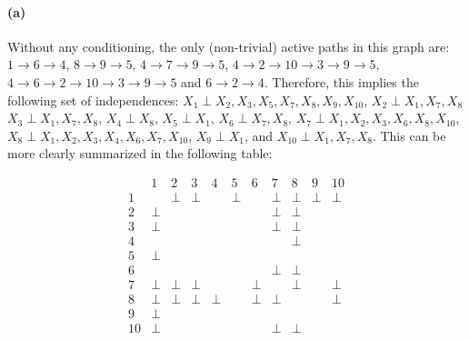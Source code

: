 \documentclass[11pt]{article}
\begin{document}
\paragraph{(a)}

Without any conditioning, the only (non-trivial) active paths in this graph
are: $1 \to 6 \to 4$, $8 \to 9 \to 5$, $4 \to 7 \to 9 \to 5$,
$4 \to 2 \to 10 \to 3 \to 9 \to 5$, $4 \to 6 \to 2 \to 10 \to 3 \to 9 \to 5$
and $6 \to 2 \to 4$.
Therefore, this implies the following set of independences:
$X_1 \perp X_2, X_3, X_5, X_7, X_8, X_9, X_{10}$, {$X_2 \perp X_1, X_7, X_8$}
{$X_3 \perp X_1, X_7, X_8$},
{$X_4 \perp X_8$},
{$X_5 \perp X_1$},
{$X_6 \perp X_7, X_8$},
{$X_7 \perp X_1, X_2, X_3, X_6, X_8, X_{10}$},
{$X_8 \perp X_1, X_2, X_3, X_4, X_6, X_7, X_{10}$},
{$X_9 \perp X_1$}, and
{$X_{10} \perp X_1, X_7, X_8$}. This can be more clearly summarized in the
following table:

\begin{equation}
    \begin{array}{c|cccccccccc}
            & 1     & 2     & 3     & 4     & 5     & 6     & 7     & 8     & 9     & 10     \\\hline
        1   &       & \perp & \perp &       & \perp &       & \perp & \perp & \perp & \perp  \\
        2   & \perp &       &       &       &       &       & \perp & \perp &       &        \\
        3   & \perp &       &       &       &       &       & \perp & \perp &       &        \\
        4   &       &       &       &       &       &       &       & \perp &       &        \\
        5   & \perp &       &       &       &       &       &       &       &       &        \\
        6   &       &       &       &       &       &       & \perp & \perp &       &        \\
        7   & \perp & \perp & \perp &       &       & \perp &       & \perp &       & \perp  \\
        8   & \perp & \perp & \perp & \perp &       & \perp & \perp &       &       & \perp  \\
        9   & \perp &       &       &       &       &       &       &       &       &        \\
        10  & \perp &       &       &       &       &       & \perp & \perp &       &        \\
    \end{array}
\end{equation}
\end{document}
